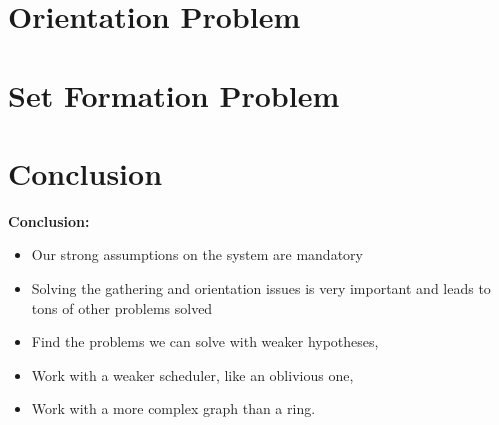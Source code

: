 \documentclass{beamer}
\begin{document}
\section{Orientation Problem}
\begin{frame}
\end{frame}
\section{Set Formation Problem}
\begin{frame}
\end{frame}


\section{Conclusion}
\begin{frame}
	\textbf{Conclusion:}
	\begin{itemize}
		\item<2-> Our strong assumptions on the system are mandatory
		\item<3-> Solving the gathering and orientation issues is very important and leads to tons of other problems solved
	\end{itemize}
	
	\begin{itemize}
		\item<5-> Find the problems we can solve with weaker hypotheses,
		\item<6-> Work with a weaker scheduler, like an oblivious one,
		\item<7-> Work with a more complex graph than a ring.
	\end{itemize}
	
\end{frame}
\end{document}
